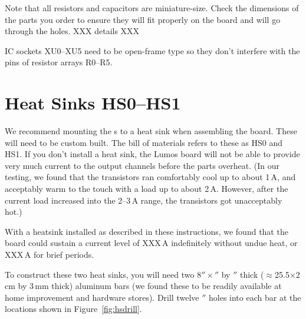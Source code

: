 \documentclass[letterpaper,twoside,onecolumn,openright,final]{memoir}
\begin{document}
Note that all resistors and capacitors are miniature-size.  Check the dimensions of the parts
you order to ensure they will fit properly on the board and will go through the holes.
XXX details XXX

IC sockets XU0--XU5 need to be open-frame type so they don't interfere with the pins of
resistor arrays R0--R5.

\section{Heat Sinks HS0--HS1}
We recommend mounting the s to a heat sink when assembling the board.  These
will need to be custom built.  The bill of materials refers to these as HS0 and HS1.  If you
don't install a heat sink, the Lumos board will not be able to provide very much current to
the output channels before the  parts overheat.  (In our testing, we found that
the transistors ran comfortably cool up to about 1\,A, and acceptably warm to the touch with
a load up to about 2\,A.  However, after the current load increased into the 2--3\,A range, 
the transistors got unacceptably hot.)

With a heatsink installed as described in these instructions, we found that the board could
sustain a current level of XXX\,A indefinitely without undue heat, or XXX\,A for brief periods.

To construct these two heat sinks, you will need two 
8$''\times$$''$ by
$''$ thick ($\approx$25.5$\times$2\,cm by 3\,mm thick) aluminum bars (we found these to be readily available at home improvement
and hardware stores).  Drill twelve $''$ holes into each bar at the locations shown in 
Figure~\ref{fig:hsdrill}.
\end{document}
